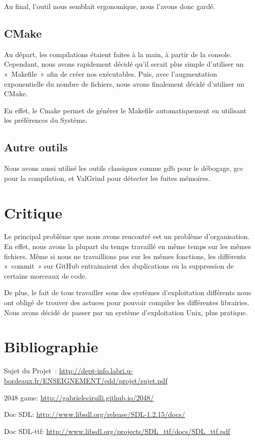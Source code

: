 \documentclass[12pt]{report}
\begin{document}
Au final, l’outil nous semblait ergonomique, nous l’avons donc gardé.

\section{CMake}
Au départ, les compilations étaient faites à la main, à partir de la console. Cependant, nous avons rapidement décidé qu’il serait plus simple d’utiliser un « Makefile » afin de créer nos exécutables. Puis, avec l’augmentation exponentielle du nombre de fichiers, nous avons finalement décidé d’utiliser un CMake.

En effet, le Cmake permet de générer le Makefile automatiquement en utilisant les préférences du Système.

\section{Autre outils}

Nous avons aussi utilisé les outils classiques comme gdb pour le débogage, gcc pour la compilation, et ValGrind pour détecter les fuites mémoires. 

\chapter{Critique}
Le principal problème que nous avons rencontré est un problème d’organisation. En effet, nous avons la plupart du temps travaillé en même temps sur les mêmes fichiers. Même si nous ne travaillions pas sur les mêmes fonctions, les différents « commit » sur GitHub entrainaient des duplications ou la suppression de certains morceaux de code. 

De plus, le fait de tous travailler sous des systèmes d’exploitation différents nous ont obligé de trouver des astuces pour pouvoir compiler les différentes librairies. Nous avons décidé de passer par un système d’exploitation Unix, plus pratique.
\chapter{Bibliographie}

Sujet du Projet : \url{http://dept-info.labri.u-bordeaux.fr/ENSEIGNEMENT/edd/projet/sujet.pdf}

2048 game: \url{http://gabrielecirulli.github.io/2048/}

Doc SDL: \url{http://www.libsdl.org/release/SDL-1.2.15/docs/}

Doc SDL-ttf: \url{http://www.libsdl.org/projects/SDL_ttf/docs/SDL_ttf.pdf}
\end{document}
